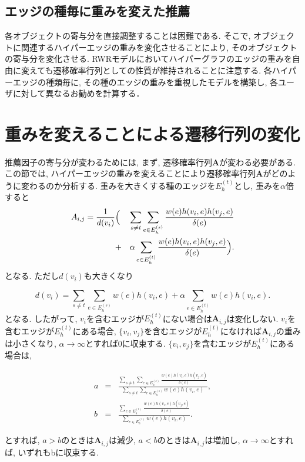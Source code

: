 \documentclass[a4j,11pt]{jarticle}           %
\begin{document}
	\subsection{エッジの種毎に重みを変えた推薦}
	各オブジェクトの寄与分を直接調整することは困難である. そこで, オブジェクトに関連するハイパーエッジの重みを変化させることにより, そのオブジェクトの寄与分を変化させる. RWRモデルにおいてハイパーグラフのエッジの重みを自由に変えても遷移確率行列としての性質が維持されることに注意する. 各ハイパーエッジの種類毎に, その種のエッジの重みを重視したモデルを構築し, 各ユーザに対して異なるお勧めを計算する．
	\newpage
	\section{重みを変えることによる遷移行列の変化}
	推薦因子の寄与分が変わるためには, まず, 遷移確率行列\textbf{A}が変わる必要がある. この節では, ハイパーエッジの重みを変えることにより遷移確率行列\textbf{A}がどのように変わるのか分析する. 重みを大きくする種のエッジを$E_h^{(t)}$とし, 重みを$\alpha$倍すると
	\begin{eqnarray}
	A_{i,j}=\frac{1}{d(v_i)}&\Bigl(&\sum_{s\neq t}\sum_{e\in E_h^{(s)}}\frac{w(e)h(v_i,e)h(v_j,e)}{\delta(e)} \nonumber\\ &+&\alpha\sum_{e\in E_h^{(t)}}\frac{w(e)h(v_i,e)h(v_j,e)}{\delta(e)}\Bigr). 
	\end{eqnarray}	
	となる. ただし$d(v_i)$も大きくなり
	
	\begin{equation}
	d(v_i)=\sum_{s\neq t}\sum_{e\in E_h^{(s)}}w(e)h(v_i,e)+\alpha\sum_{e\in E_h^{(t)}}w(e)h(v_i,e). 
	\end{equation}
	となる. したがって, $v_i$を含むエッジが$E_h^{(t)}$にない場合は$\textbf{A}_{i,j}$は変化しない. $v_i$を含むエッジが$E_h^{(t)}$にある場合, $\{v_i, v_j\}$を含むエッジが$E_h^{(t)}$になければ$\textbf{A}_{i,j}$の重みは小さくなり, $\alpha \rightarrow \infty$とすれば0に収束する. $\{v_i, v_j\}$を含むエッジが$E_h^{(t)}$にある場合は,
	
	\begin{eqnarray}
	a &=& \frac{\sum_{s\neq t}\sum_{e\in E_h^{(s)}}\frac{w(e)h(v_i,e)h(v_j,e)}{\delta(e)}}{\sum_{s\neq t}\sum_{e\in E_h^{(s)}}w(e)h(v_i,e)}, \\
	b &=& \frac{\sum_{e\in E_h^{(t)}}\frac{w(e)h(v_i,e)h(v_j,e)}{\delta(e)}}{\sum_{e\in E_h^{(t)}}w(e)h(v_i,e)}.
	\end{eqnarray}
	
	とすれば, $a>b$のときは$\textbf{A}_{i,j}$は減少, $a<b$のときは$\textbf{A}_{i,j}$は増加し, $\alpha \rightarrow \infty$とすれば, いずれもbに収束する.
	\newpage
\end{document}
